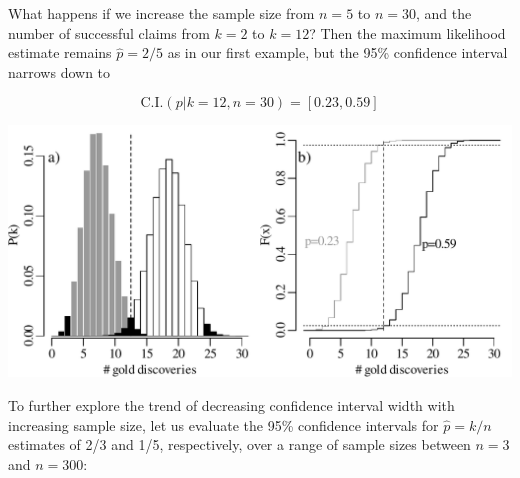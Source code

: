 What happens if we increase the sample size from $n=5$ to $n=30$, and
the number of successful claims from $k=2$ to $k=12$?  Then the
maximum likelihood estimate remains $\hat{p}=2/5$ as in our first
example, but the 95\% confidence interval narrows down to

\[
\mbox{C.I.}(p|k=12,n=30) = [0.23, 0.59]
\]

\noindent\begin{minipage}[t][][b]{.65\textwidth}
  \includegraphics[width=\textwidth]{../figures/binomcik12n30.pdf}\\
\end{minipage}
\begin{minipage}[t][][t]{.35\textwidth}
  \label{fig:binomcik12n30}
\end{minipage}

To further explore the trend of decreasing confidence interval width
with increasing sample size, let us evaluate the 95\% confidence
intervals for $\hat{p}=k/n$ estimates of 2/3 and 1/5, respectively,
over a range of sample sizes between $n=3$ and $n=300$:\\


